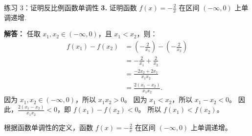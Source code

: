 \documentclass[aspectratio=169,13pt,t] {beamer}
\theoremstyle{definition}
\begin{document}
\begin{frame}{练习 3：证明反比例函数单调性}\vspace{-0.5cm}
	\textbf{\textcolor{myblue}{3.}} 证明函数 \(f(x)=-\frac{2}{x}\) 在区间 \((-\infty, 0)\) 上单调递增.
	
	\textbf{解答：}
	任取 \(x_1, x_2 \in (-\infty, 0)\)，且 \(x_1 < x_2\)，则：
	\begin{align*}
		f(x_1) - f(x_2) &= \left(-\frac{2}{x_1}\right) - \left(-\frac{2}{x_2}\right) \\
		&= -\frac{2}{x_1} + \frac{2}{x_2} \\
		&= \frac{-2x_2 + 2x_1}{x_1x_2} \\
		&= \frac{2(x_1 - x_2)}{x_1x_2}.
	\end{align*}
	因为 \(x_1, x_2 \in (-\infty, 0)\)，所以 \(x_1x_2 > 0\)。
	因为 \(x_1 < x_2\)，所以 \(x_1 - x_2 < 0\)。
	因此，\(\frac{2(x_1 - x_2)}{x_1x_2} < 0\)，即 \(f(x_1) - f(x_2) < 0\)。
	所以 \(f(x_1) < f(x_2)\)。
	
	根据函数单调性的定义，函数 \(f(x)=-\frac{2}{x}\) 在区间 \((-\infty, 0)\) 上单调递增。
\end{frame}
\end{document}
